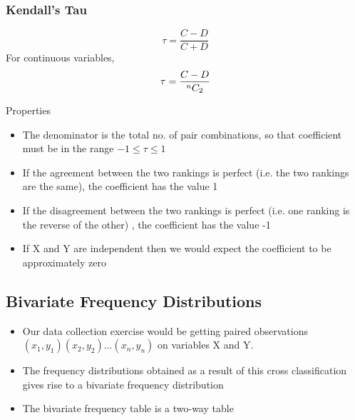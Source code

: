 \documentclass[
10pt, %
a4paper, %
]{report}
\begin{document}
\subsubsection*{Kendall's Tau}
\[
\tau = \frac{C-D}{C+D}
\]
For continuous variables,
\[
\tau = \frac{C-D}{{}^{n}C_{2}}
\]

Properties
\begin{itemize}
\item The denominator is the total no. of pair combinations, so that
coefficient must be in the range \(-1\le\tau\le1\)
\item If the agreement between the two rankings is perfect (i.e. the two rankings are the same), the coefficient has the value 1
\item If the disagreement between the two rankings is perfect (i.e. one ranking is the reverse of the other) , the coefficient has the value -1
\item If X and Y are independent then we would expect the coefficient to be approximately zero
\end{itemize}

\subsection*{Bivariate Frequency Distributions}
\begin{itemize}
\item Our data collection exercise would be getting paired observations \((x_1, y_1) (x_2, y_2) \dots (x_n, y_n)\) on variables X and Y.
\item The frequency distributions obtained as a result of this cross classification gives rise to a bivariate frequency distribution
\item The bivariate frequency table is a two-way table
\end{itemize}
\end{document}
